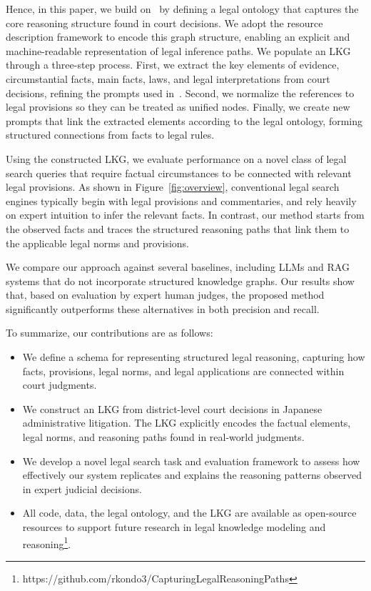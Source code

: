 \documentclass[11pt]{article}
\begin{document}
Hence, in this paper, we build on~\cite{kondo2024collaborative} by defining a legal ontology that captures the core reasoning structure found in court decisions. We adopt the resource description framework to encode this graph structure, enabling an explicit and machine-readable representation of legal inference paths. We populate an LKG through a three-step process. First, we extract the key elements of evidence, circumstantial facts, main facts, laws, and legal interpretations from court decisions, refining the prompts used in~\cite{kondo2024collaborative}. Second, we normalize the references to legal provisions so they can be treated as unified nodes. Finally, we create new prompts that link the extracted elements according to the legal ontology, forming structured connections from facts to legal rules. 

Using the constructed LKG, we evaluate performance on a novel class of legal search queries that require factual circumstances to be connected with relevant legal provisions. As shown in Figure~\ref{fig:overview}, conventional legal search engines typically begin with legal provisions and commentaries, and rely heavily on expert intuition to infer the relevant facts. In contrast, our method starts from the observed facts and traces the structured reasoning paths that link them to the applicable legal norms and provisions.

We compare our approach against several baselines, including LLMs and RAG systems that do not incorporate structured knowledge graphs. Our results show that, based on evaluation by expert human judges, the proposed method significantly outperforms these alternatives in both precision and recall.


To summarize, our contributions are as follows:
\begin{itemize}
\item We define a schema for representing structured legal reasoning, capturing how facts, provisions, legal norms, and legal applications are connected within court judgments.
\item We construct an LKG from district-level court decisions in Japanese administrative litigation. The LKG explicitly encodes the factual elements, legal norms, and reasoning paths found in real-world judgments.
\item We develop a novel legal search task and evaluation framework to assess how effectively our system replicates and explains the reasoning patterns observed in expert judicial decisions.
\item All code, data, the legal ontology, and the LKG are available as open-source resources to support future research in legal knowledge modeling and reasoning\footnote{https://github.com/rkondo3/CapturingLegalReasoningPaths}.
\end{itemize}
\end{document}
